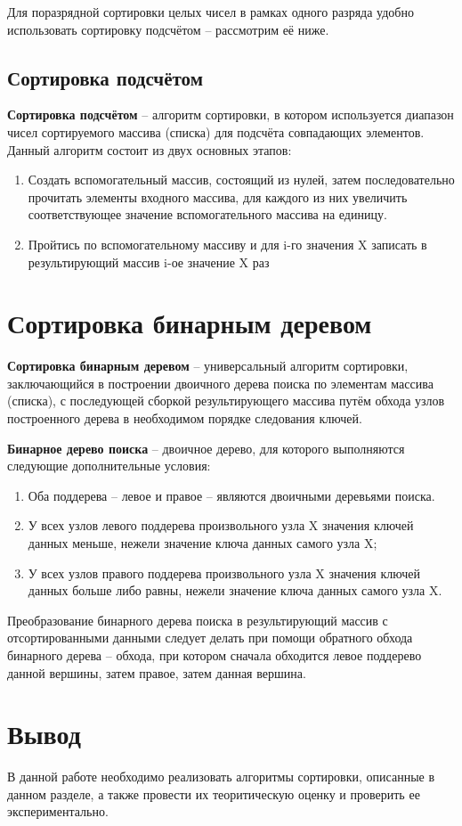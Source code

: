 Для поразрядной сортировки целых чисел в рамках одного разряда удобно использовать сортировку подсчётом -- рассмотрим её ниже.

\subsection{Сортировка подсчётом}

\textbf{Сортировка подсчётом} \cite{counting-sort}  --  алгоритм сортировки, в котором используется диапазон чисел сортируемого массива (списка) для подсчёта совпадающих элементов. Данный алгоритм состоит из двух основных этапов:
\begin{enumerate}
	\item Создать вспомогательный массив, состоящий из нулей, затем последовательно прочитать элементы входного массива, для каждого из них увеличить соответствующее значение вспомогательного массива на единицу.
	\item Пройтись по вспомогательному массиву и для i-го значения X записать в результирующий массив i-ое значение X раз
\end{enumerate}

\section{Сортировка бинарным деревом}
\textbf{Сортировка бинарным деревом} \cite{bst-sort}  -- универсальный алгоритм сортировки, заключающийся в построении двоичного дерева поиска по элементам массива (списка), с последующей сборкой результирующего массива путём обхода узлов построенного дерева в необходимом порядке следования ключей.
	

\textbf{Бинарное дерево поиска } \cite{bst-sort}  -- двоичное дерево, для которого выполняются следующие дополнительные условия:
\begin{enumerate}
	\item Оба поддерева -- левое и правое -- являются двоичными деревьями поиска.
	\item У всех узлов левого поддерева произвольного узла X значения ключей данных меньше, нежели значение ключа данных самого узла X;
	\item У всех узлов правого поддерева произвольного узла X значения ключей данных больше либо равны, нежели значение ключа данных самого узла X.
\end{enumerate}


Преобразование бинарного дерева поиска в результирующий массив с отсортированными данными следует делать при помощи обратного обхода бинарного дерева -- обхода, при котором сначала обходится левое поддерево данной вершины, затем правое, затем данная вершина.


\section*{Вывод}
В данной работе необходимо реализовать алгоритмы сортировки, описанные в данном разделе, а также провести их теоритическую оценку и проверить ее экспериментально.